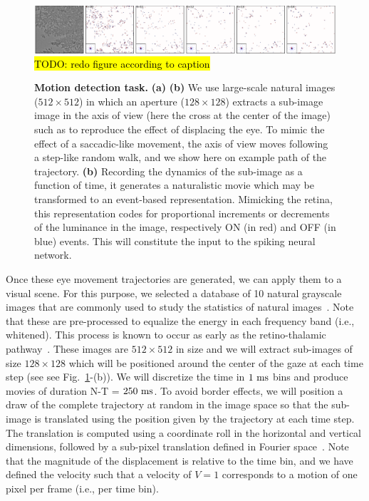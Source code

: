 \documentclass[default]{sn-jnl}%
\theoremstyle{thmstyleone}%
\theoremstyle{thmstyletwo}%
\theoremstyle{thmstylethree}%
\newcommand{\seeFig}[1]{see Fig.~\ref{fig:#1}}%
\newcommand{\note}[1]{{\sethlcolor{yellow}\hl{#1}}}
\begin{document}
\begin{figure}[h!]%
    \centering
    \includegraphics[width=0.95\linewidth]{figures/motion_task.pdf}
    \note{TODO: redo figure according to caption}
    \caption{
    {\bf Motion detection task.} {\bf (a)}  {\bf (b)} We use large-scale natural images ($512\times512$) in which an aperture ($128\times128$) extracts a sub-image image in the axis of view (here the cross at the center of the image) such as to reproduce the effect of displacing the eye. To mimic the effect of a saccadic-like movement, the axis of view moves following a step-like random walk, and we show here on example path of the trajectory. {\bf (b)} Recording the dynamics of the sub-image as a function of time, it generates a naturalistic movie which may be transformed to an event-based representation. Mimicking the retina, this representation codes for proportional increments or decrements of the luminance in the image, respectively ON (in red) and OFF (in blue) events. This will constitute the input to the spiking neural network.}
    \label{fig:motion_task}
\end{figure}
Once these eye movement trajectories are generated, we can apply them to a visual scene. For this purpose, we selected a database of 10 natural grayscale images that are commonly used to study the statistics of natural images~\citep{olshausen_emergence_1996}. Note that these are pre-processed to equalize the energy in each frequency band (i.e., whitened). This process is known to occur as early as the retino-thalamic pathway~\citep{dan_efficient_1996}. These images are $512 \times 512$ in size and we will extract sub-images of size $128 \times 128$ which will be positioned around the center of the gaze at each time step (see \seeFig{motion_task}-(b)). We will discretize the time in $1~\si{\milli\second}$ bins and produce movies of duration N-T = $250~\si{\milli\second}$. To avoid border effects, we will position a draw of the complete trajectory at random in the image space so that the sub-image is translated using the position given by the trajectory at each time step. The translation is computed using a coordinate roll in the horizontal and vertical dimensions, followed by a sub-pixel translation defined in Fourier space~\citep{perrinet_sparse_2015}. Note that the magnitude of the displacement is relative to the time bin, and we have defined the velocity such that a velocity of $V=1$ corresponds to a motion of one pixel per frame (i.e., per time bin).
\end{document}
